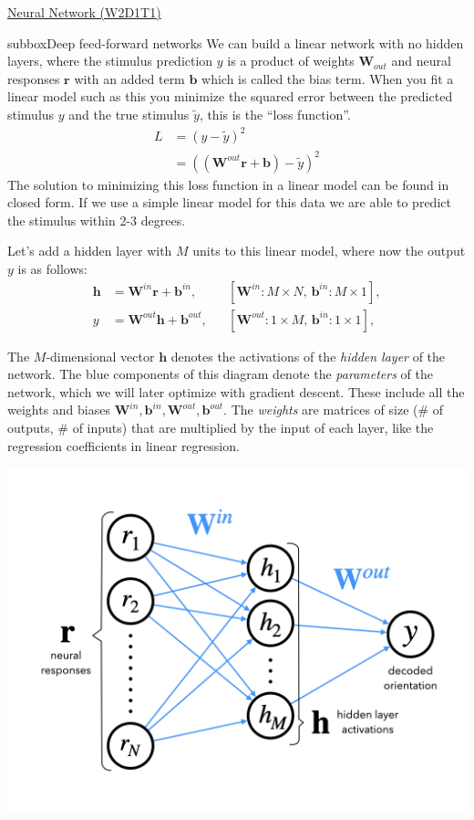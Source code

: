 \begin{textbox}{\href{https://compneuro.neuromatch.io/tutorials/W2D1_DeepLearning/student/W2D1_Tutorial1.html}{Neural Network (W2D1T1)} }
\begin{subbox}{subbox}{Deep feed-forward networks}
\scriptsize
We can build a linear network with no hidden layers, where the stimulus prediction $y$ is a product of weights $\mathbf{W}_{out}$ and neural responses $\mathbf{r}$ with an added term $\mathbf{b}$ which is called the bias term. When you fit a linear model such as this you minimize the squared error between the predicted stimulus $y$ and the true stimulus $\tilde{y}$, this is the “loss function”. 
\begin{align}
    L &= (y - \tilde{y})^2 \\
     &= ((\mathbf{W}^{out} \mathbf{r} + \mathbf{b}) - \tilde{y})^2
\end{align}
The solution to minimizing this loss function in a linear model can be found in closed form. If we use a simple linear model for this data we are able to predict the stimulus within 2-3 degrees. 

Let’s add a hidden layer with $M$ units to this linear model, where now the output $y$ is as follows:
\begin{align}
    \mathbf{h} &= \mathbf{W}^{in} \mathbf{r} + \mathbf{b}^{in}, && [\mathbf{W}^{in}: M \times N,\, \mathbf{b}^{in}: M \times 1], \\
    y &= \mathbf{W}^{out} \mathbf{h} + \mathbf{b}^{out},  && [\mathbf{W}^{out}: 1 \times M,\, \mathbf{b}^{in}: 1 \times 1],
\end{align}

The $M$-dimensional vector $\mathbf{h}$ denotes the activations of the \textit{hidden layer} of the network. The blue components of this diagram denote the \textit{parameters} of the network, which we will later optimize with gradient descent. These include all the weights and biases $\mathbf{W}^{in}, \mathbf{b}^{in}, \mathbf{W}^{out}, \mathbf{b}^{out}$. The \textit{weights} are matrices of size (# of outputs, # of inputs) that are multiplied by the input of each layer, like the regression coefficients in linear regression.

\centering
\includegraphics[scale=0.1]{Figures/DL/DLFigure1.png}
\end{subbox}



\end{textbox}
